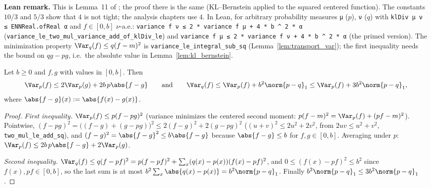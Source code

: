 \textbf{Lean remark.} This is Lemma~11 of \cite{menard2021fast}; the proof there is the same
(KL--Bernstein applied to the squared centered function). The constants $10/3$ and $5/3$ show
that $4$ is not tight; the analysis chapters use $4$. In Lean, for arbitrary probability measures
\texttt{μ} ($p$), \texttt{ν} ($q$) with \texttt{klDiv μ ν ≤ ENNReal.ofReal α} and $f \in [0, b]$
$\nu$-a.e.: \texttt{variance f ν ≤ 2 * variance f μ + 4 * b \^{} 2 * α}
(\texttt{variance\_le\_two\_mul\_variance\_add\_of\_klDiv\_le}) and
\texttt{variance f μ ≤ 2 * variance f ν + 4 * b \^{} 2 * α} (the primed version). The minimization
property $\Var_q(f) \le q(f - m)^2$ is \texttt{variance\_le\_integral\_sub\_sq}
(Lemma~\ref{lem:transport_var}); the first inequality needs the bound on $qg - pg$, i.e.\ the
absolute value in Lemma~\ref{lem:kl_bernstein}.

\begin{lemma}\label{lem:transport_var}
\leanok
Let $b \ge 0$ and $f, g$ with values in $[0, b]$. Then
\[
  \Var_p(f) \le 2\Var_p(g) + 2b\, p\abs{f - g} \qquad \text{and} \qquad
  \Var_q(f) \le \Var_p(f) + b^2 \norm{p - q}_1 \le \Var_p(f) + 3b^2\norm{p - q}_1 ,
\]
where $\abs{f - g}(x) := \abs{f(x) - g(x)}$.
\end{lemma}

\begin{proof}
\leanok
\emph{First inequality.} $\Var_p(f) \le p(f - pg)^2$ (variance minimizes the centered second
moment: $p(f - m)^2 = \Var_p(f) + (pf - m)^2$). Pointwise,
$(f - pg)^2 = \big((f - g) + (g - pg)\big)^2 \le 2(f - g)^2 + 2(g - pg)^2$
($(u + v)^2 \le 2u^2 + 2v^2$, from $2uv \le u^2 + v^2$, \texttt{two\_mul\_le\_add\_sq}), and $(f - g)^2 = \abs{f - g}^2 \le b\abs{f - g}$
because $\abs{f - g} \le b$ for $f, g \in [0, b]$. Averaging under $p$:
$\Var_p(f) \le 2b\,p\abs{f - g} + 2\Var_p(g)$.

\emph{Second inequality.} $\Var_q(f) \le q(f - pf)^2 = p(f - pf)^2 + \sum_x (q(x) - p(x))(f(x) - pf)^2$,
and $0 \le (f(x) - pf)^2 \le b^2$ since $f(x), pf \in [0, b]$, so the last sum is at most
$b^2\sum_x \abs{q(x) - p(x)} = b^2\norm{p - q}_1$. Finally $b^2\norm{p - q}_1 \le 3b^2\norm{p - q}_1$.
\end{proof}

